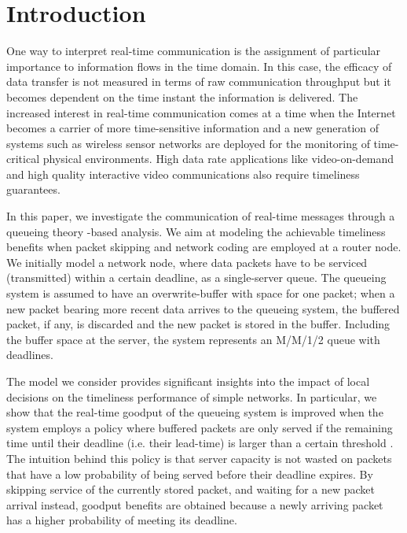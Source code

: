 \documentclass[preprint,12pt]{elsarticle}
\theoremstyle{definition}
\theoremstyle{plain}
\theoremstyle{remark}
\begin{document}
\section{Introduction}
One way to interpret real-time communication is the assignment of particular importance to information flows in the time domain. In this case, the efficacy of data transfer is not measured in terms of raw communication throughput but it becomes dependent on the time instant the information is delivered. The increased interest in real-time communication comes at a time when the Internet becomes a carrier of more time-sensitive information and a new generation of systems such as wireless sensor networks are deployed for the monitoring of time-critical physical environments. High data rate applications like video-on-demand and high quality interactive video communications also require timeliness guarantees.

In this paper, we investigate the communication of real-time messages through a queueing theory -based analysis. We aim at modeling the achievable timeliness benefits when packet skipping and network coding are employed at a router node. We initially model a network node, where data packets have to be serviced (transmitted) within a certain deadline, as a single-server queue. The queueing system is assumed to have an overwrite-buffer with space for one packet; when a new packet bearing more recent data arrives to the queueing system, the buffered packet, if any, is discarded and the new packet is stored in the buffer. Including the buffer space at the server, the system represents an M/M/1/2 queue with deadlines.

The model we consider provides significant insights into the impact of local decisions on the timeliness performance of simple networks. In particular, we show that the real-time goodput of the queueing system is improved when the system employs a policy where buffered packets are only served if the remaining time until their deadline (i.e. their lead-time) is larger than a certain threshold . The intuition behind this policy is that server capacity is not wasted on packets that have a low probability of being served before their deadline expires. By skipping service of the currently stored packet, and waiting for a new packet arrival instead, goodput benefits are obtained because a newly arriving packet has a higher probability of meeting its deadline.
\end{document}
